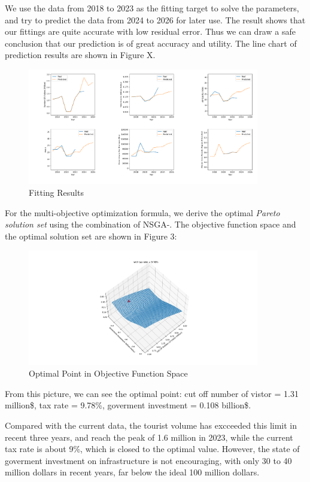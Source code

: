 \documentclass{mcmthesis}
\begin{document}
We use the data from 2018 to 2023 as the fitting target to solve the parameters, and try to predict the data from 2024 to 2026 for later use. 
The result shows that our fittings are quite accurate with low residual error. Thus we can draw a safe conclusion that our prediction
is of great accuracy and utility. The line chart of prediction results are shown in Figure X.
\begin{figure}[H]
  \centering
  \includegraphics[width=0.9\textwidth]{figures/pc.png}
  \caption{Fitting Results}
  \label{Figure.XX}
\end{figure}

For the multi-objective optimization formula, we derive the optimal \emph{Pareto solution set} using the combination of NSGA-\uppercase\expandafter{}.
The objective function space and the optimal solution set are shown in Figure 3:
\begin{figure}[H]
  \centering
  \includegraphics[width=0.9\textwidth]{figures/model1opt.png}
  \caption{Optimal Point in Objective Function Space}
  \label{Figure.XXX}
\end{figure}

From this picture, we can see the optimal point: cut off number of vistor = 1.31 million\$, tax rate = 9.78\%, goverment investment = 0.108 billion\$.

Compared with the current data, the tourist volume has excceeded this limit in recent three years, and reach the peak of 1.6 million in 2023, 
while the current tax rate is about 9\%, which is closed to the optimal value. However, the state of goverment investment on infrastructure is not encouraging,
with only 30 to 40 million dollars in recent years, far below the ideal 100 million dollars.
\end{document}
